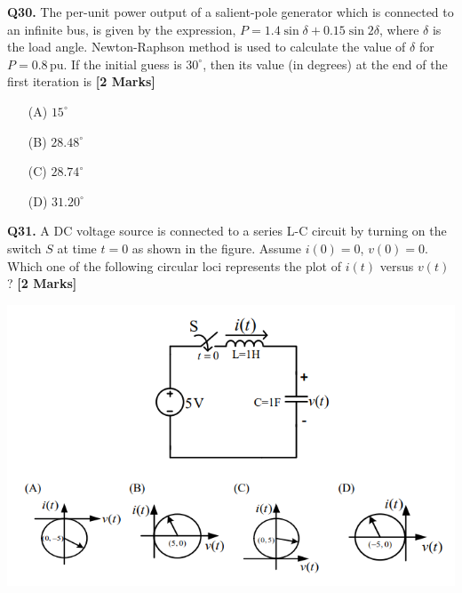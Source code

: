 \documentclass[11pt]{article}
\newcommand{\questionb}[2]{
    \noindent\textbf{Q#2.} #1 \hfill \textbf{[2 Marks]}
}
\begin{document}
\questionb{The per-unit power output of a salient-pole generator which is connected to an infinite bus, is given by the expression, \( P = 1.4 \sin \delta + 0.15 \sin 2\delta \), where \( \delta \) is the load angle. Newton-Raphson method is used to calculate the value of \( \delta \) for \( P = 0.8 \, \text{pu} \). If the initial guess is \( 30^\circ \), then its value (in degrees) at the end of the first iteration is}{30}
\begin{enumerate}
    \item[(A)] \( 15^\circ \)
    \item[(B)] \( 28.48^\circ \)
    \item[(C)] \( 28.74^\circ \)
    \item[(D)] \( 31.20^\circ \)
\end{enumerate}
\vspace{0.5cm}

\questionb{A DC voltage source is connected to a series L-C circuit by turning on the switch \( S \) at time \( t = 0 \) as shown in the figure. Assume \( i(0) = 0 \), \( v(0) = 0 \). Which one of the following circular loci represents the plot of \( i(t) \) versus \( v(t) \)?}{31}
\begin{center}
\includegraphics[width=1\textwidth]{figures/31.png}
\end{center}

\vspace{0.5cm}
\end{document}
